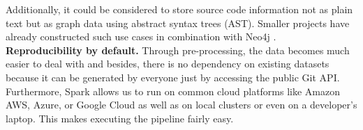 Additionally, it could be considered to store source code information not as plain text but as graph data using abstract syntax trees (AST). Smaller projects have already constructed such use cases in combination with Neo4j \cite{Arora2019}.\\
\textbf{Reproducibility by default.} Through pre-processing, the data becomes much easier to deal with and besides, there is no dependency on existing datasets because it can be generated by everyone just by accessing the public Git API. Furthermore, Spark allows us to run on common cloud platforms like Amazon AWS, Azure, or Google Cloud as well as on local clusters or even on a developer's laptop. This makes executing the pipeline fairly easy. 